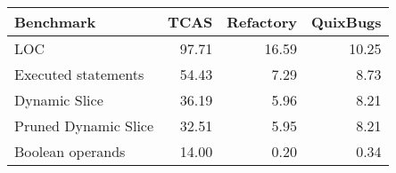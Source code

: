 \begin{tabular}{lrrr}
\toprule
\textbf{Benchmark} & \textbf{TCAS} & \textbf{Refactory} & \textbf{QuixBugs} \\
\midrule
LOC & 97.71 & 16.59 & 10.25 \\
Executed statements & 54.43 & 7.29 & 8.73 \\
Dynamic Slice & 36.19 & 5.96 & 8.21 \\
Pruned Dynamic Slice & 32.51 & 5.95 & 8.21 \\
Boolean operands & 14.00 & 0.20 & 0.34 \\
\bottomrule
\end{tabular}
